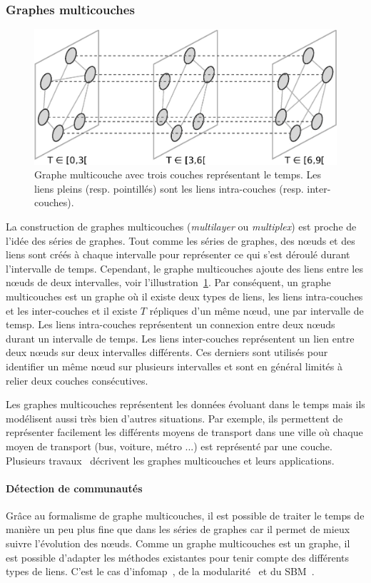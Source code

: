 \subsubsection{Graphes multicouches}
\begin{figure}[h]
\centering
\includegraphics[width=0.7\linewidth]{img/Intro/multiplex.eps}
\caption{Graphe multicouche avec trois couches représentant le temps.
Les liens pleins (resp. pointillés) sont les liens intra-couches (resp. inter-couches).}
\label{fig:exemple_multiplex}
\end{figure}
La construction de graphes multicouches (\emph{multilayer} ou \emph{multiplex}) est proche de l'idée des séries de graphes.
Tout comme les séries de graphes, des n\oe uds et des liens sont créés à chaque intervalle pour représenter ce qui s'est déroulé durant l'intervalle de temps.
Cependant, le graphe multicouches ajoute des liens entre les n\oe uds de deux intervalles, voir l'illustration~\ref{fig:exemple_multiplex}.
Par conséquent, un graphe multicouches est un graphe où il existe deux types de liens, les liens intra-couches et les inter-couches et il existe $T$ répliques d'un même n\oe ud, une par intervalle de temsp.
Les liens intra-couches représentent un connexion entre deux n\oe uds durant un intervalle de temps.
Les liens inter-couches représentent un lien entre deux n\oe uds sur deux intervalles différents.
Ces derniers sont utilisés pour identifier un même n\oe ud sur plusieurs intervalles et sont en général limités à relier deux couches consécutives.

Les graphes multicouches représentent les données évoluant dans le temps mais ils modélisent aussi très bien d'autres situations.
Par exemple, ils permettent de représenter facilement les différents moyens de transport dans une ville où chaque moyen de transport (bus, voiture, métro ...) est représenté par une couche.
Plusieurs travaux~\cite{DeDomenico2013,Kivela2014,Boccaletti2014} décrivent les graphes multicouches et leurs applications.



\paragraph{Détection de communautés}
Grâce au formalisme de graphe multicouches, il est possible de traiter le temps de manière un peu plus fine que dans les séries de graphes car il permet de mieux suivre l'évolution des n\oe uds.
Comme un graphe multicouches est un graphe, il est possible d'adapter les méthodes existantes pour tenir compte des différents types de liens.
C'est le cas d'infomap~\cite{DeDomenico2014}, de la modularité~\cite{Mucha2010,Bassett2013,Bazzi2016} et du SBM~\cite{Stanley,Peixoto2015c}.


